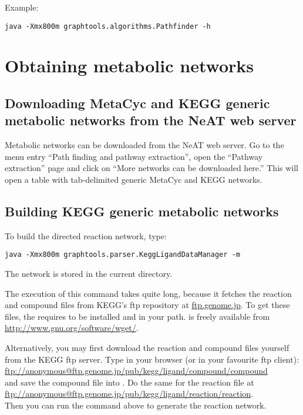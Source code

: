 Example:

\begin{lstlisting}
java -Xmx800m graphtools.algorithms.Pathfinder -h
\end{lstlisting}

\section{Obtaining metabolic networks}

\subsection{Downloading MetaCyc and KEGG generic metabolic networks from the
NeAT web server}\label{Download}

Metabolic networks can be downloaded from the NeAT web server.
Go to the menu entry ``Path finding and pathway extraction'', open the
``Pathway extraction'' page and click on ``More networks can be downloaded
here.'' This will open a table with tab-delimited generic MetaCyc and KEGG
networks.

\subsection{Building KEGG generic metabolic networks} 

To build the directed reaction network, type:

\begin{lstlisting}
java -Xmx800m graphtools.parser.KeggLigandDataManager -m
\end{lstlisting}

The network is stored in the current directory.

The execution of this command takes quite long, because it fetches the reaction
and compound files from KEGG's ftp repository at \url{ftp.genome.jp}. 
To get these files, the  requires
 to be installed and in your path.  is 
freely available from \url{http://www.gnu.org/software/wget/}.

Alternatively, you may first download the reaction and compound files yourself
from the KEGG ftp server. Type in your browser (or in your favourite ftp
client):\\
\url{ftp://anonymous@ftp.genome.jp/pub/kegg/ligand/compound/compound}\\
and save the compound file into . Do
the same for the reaction file at\\
\url{ftp://anonymous@ftp.genome.jp/pub/kegg/ligand/reaction/reaction}.\\ 
Then you can run the command above to generate the reaction network.

